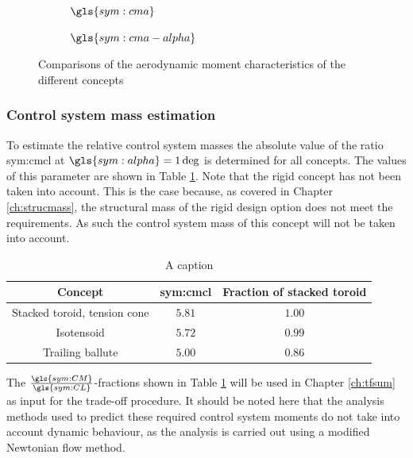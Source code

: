 \begin{figure}[h]
	\centering
	\begin{subfigure}[b]{0.49\textwidth}

		\setlength{} 
		\setlength{}
				

		\caption{$\gls{sym:cma}$}
		\label{fig:cm}
	\end{subfigure}
	\begin{subfigure}[b]{0.49\textwidth}

		\setlength{} 
		\setlength{}
				

		\caption{$\gls{sym:cma-alpha}$}
		\label{fig:cmalpha}
	\end{subfigure}
	\caption{Comparisons of the aerodynamic moment characteristics of the different concepts}
	\label{fig:cmplots}
\end{figure}

\subsubsection{Control system mass estimation}
To estimate the relative control system masses the absolute value of the ratio \gls{sym:cmcl} at $\gls{sym:alpha}=1\deg$ is determined for all concepts. The values of this parameter are shown in Table \ref{tab:controlmass}. Note that the rigid concept has not been taken into account. This is the case because, as covered in Chapter \ref{ch:strucmass}, the structural mass of the rigid design option does not meet the requirements. As such the control system mass of this concept will not be taken into account. 

\begin{table}[h]
	\centering
	\caption{A caption}
	\begin{tabular}{|c|c|c|}
		\hline
		\textbf{Concept} & \textbf{\gls{sym:cmcl}} & \textbf{Fraction of stacked toroid} \\ \hline \hline
		Stacked toroid, tension cone & $5.81$ & $1.00$\\
		Isotensoid & $5.72$ & $0.99$\\
		Trailing ballute & $5.00$ & $0.86$\\
		\hline
	\end{tabular}
	\label{tab:controlmass}
\end{table}

The $\frac{\gls{sym:CM}}{\gls{sym:CL}}$-fractions shown in Table \ref{tab:controlmass} will be used in Chapter \ref{ch:tfsum} as input for the trade-off procedure. It should be noted here that the analysis methods used to predict these required control system moments do not take into account dynamic behaviour, as the analysis is carried out using a modified Newtonian flow method.

